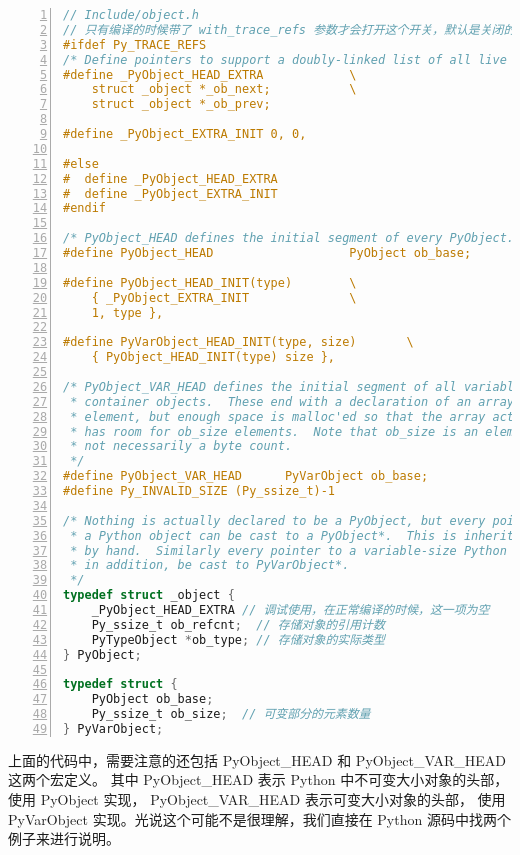 \begin{lstlisting}[language=C, numbers=left, numbersep=1em, numberstyle=\footnotesize , breaklines=true]
// Include/object.h
// 只有编译的时候带了 with_trace_refs 参数才会打开这个开关，默认是关闭的
#ifdef Py_TRACE_REFS
/* Define pointers to support a doubly-linked list of all live heap objects. */
#define _PyObject_HEAD_EXTRA            \
    struct _object *_ob_next;           \
    struct _object *_ob_prev;

#define _PyObject_EXTRA_INIT 0, 0,

#else
#  define _PyObject_HEAD_EXTRA
#  define _PyObject_EXTRA_INIT
#endif

/* PyObject_HEAD defines the initial segment of every PyObject. */
#define PyObject_HEAD                   PyObject ob_base;

#define PyObject_HEAD_INIT(type)        \
    { _PyObject_EXTRA_INIT              \
    1, type },

#define PyVarObject_HEAD_INIT(type, size)       \
    { PyObject_HEAD_INIT(type) size },

/* PyObject_VAR_HEAD defines the initial segment of all variable-size
 * container objects.  These end with a declaration of an array with 1
 * element, but enough space is malloc'ed so that the array actually
 * has room for ob_size elements.  Note that ob_size is an element count,
 * not necessarily a byte count.
 */
#define PyObject_VAR_HEAD      PyVarObject ob_base;
#define Py_INVALID_SIZE (Py_ssize_t)-1

/* Nothing is actually declared to be a PyObject, but every pointer to
 * a Python object can be cast to a PyObject*.  This is inheritance built
 * by hand.  Similarly every pointer to a variable-size Python object can,
 * in addition, be cast to PyVarObject*.
 */
typedef struct _object {
    _PyObject_HEAD_EXTRA // 调试使用，在正常编译的时候，这一项为空
    Py_ssize_t ob_refcnt;  // 存储对象的引用计数
    PyTypeObject *ob_type; // 存储对象的实际类型
} PyObject;

typedef struct {
    PyObject ob_base;
    Py_ssize_t ob_size;  // 可变部分的元素数量
} PyVarObject;
\end{lstlisting}

上面的代码中，需要注意的还包括 PyObject\_HEAD 和 PyObject\_VAR\_HEAD 这两个宏定义。
其中 PyObject\_HEAD 表示 Python 中不可变大小对象的头部，使用 PyObject 实现， PyObject\_VAR\_HEAD 表示可变大小对象的头部，
使用 PyVarObject 实现。光说这个可能不是很理解，我们直接在 Python 源码中找两个例子来进行说明。


